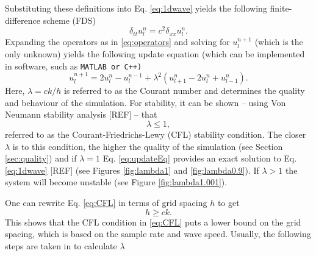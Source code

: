 \documentclass[dvipsnames, preprint]{JASA}
\def\SWcomment[#1]{\textcolor{Bittersweet}{#1}}
\begin{document}
Substituting these definitions into Eq. \eqref{eq:1dwave} yields the following finite-difference scheme (FDS)
\begin{equation}\label{eq:FDS}
    \delta_{tt}u_l^n = c^2 \delta_{xx}u_l^n.
\end{equation}
Expanding the operators as in %
\eqref{eq:operators} and solving for $u_l^{n+1}$ (which is the only unknown) yields the following update equation \SWcomment[(which can be implemented in software, such as {\tt MATLAB} or {\tt C++})]
\begin{equation}\label{eq:updateEq}
    u_l^{n+1} = 2u_l^n-u_l^{n-1} + \lambda^2 \left(u_{l+1}^n-2u_l^n + u_{l-1}^n\right).
\end{equation}
Here, $\lambda = ck/h$ is referred to as the Courant number and determines the quality and behaviour of the simulation. For stability, it can be shown -- using Von Neumann stability analysis [REF] -- that \begin{equation}\label{eq:CFL}
    \lambda \leq 1,
\end{equation}
referred to as the Courant-Friedrichs-Lewy (CFL) stability condition. The closer $\lambda$ is to this condition, the higher the quality of the simulation (see Section \ref{sec:quality}) and if $\lambda = 1$ Eq. \eqref{eq:updateEq} provides an exact solution to Eq. \eqref{eq:1dwave} %
[REF] (see Figures \ref{fig:lambda1} and \ref{fig:lambda0.9}). If $\lambda > 1$ the system will become unstable (see Figure \ref{fig:lambda1.001}).
\begin{figure}
\end{figure}
One can rewrite Eq. \eqref{eq:CFL} in terms of grid spacing $h$ to get
\begin{equation}\label{eq:stabilityCond}
    h \geq ck.
\end{equation}
This shows that the CFL condition in \eqref{eq:CFL} puts a lower bound on the grid spacing, which is based on the sample rate and wave speed. Usually, the following steps are taken in to calculate $\lambda$
\end{document}
